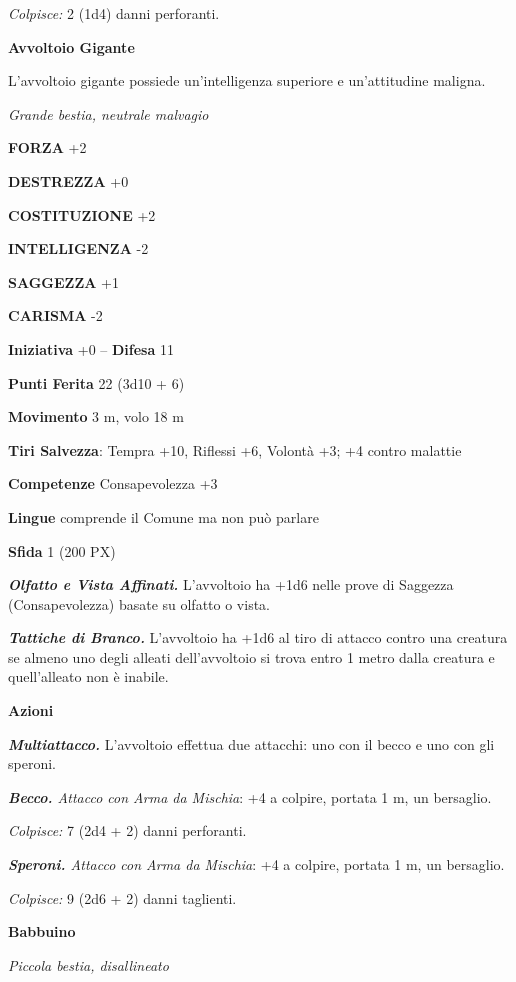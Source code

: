 \begin{multicols}{2}
\textit{Colpisce:} 2 (1d4) danni perforanti.

\medskip\textbf{Avvoltoio Gigante}

L'avvoltoio gigante possiede un'intelligenza superiore e un'attitudine maligna.

\textit{Grande bestia, neutrale malvagio}

\textbf{FORZA} +2

\textbf{DESTREZZA} +0

\textbf{COSTITUZIONE} +2

\textbf{INTELLIGENZA} -2

\textbf{SAGGEZZA} +1

\textbf{CARISMA} -2

\textbf{Iniziativa} +0 -- \textbf{Difesa} 11

\textbf{Punti Ferita} 22 (3d10 + 6)

\textbf{Movimento} 3 m, volo 18 m

\textbf{Tiri Salvezza}: Tempra +10, Riflessi +6, Volontà +3; +4 contro malattie

\textbf{Competenze} Consapevolezza +3

\textbf{Lingue} comprende il Comune ma non può parlare

\textbf{Sfida} 1 (200 PX)

\textit{\textbf{Olfatto e Vista Affinati.}} L'avvoltoio ha +1d6 nelle prove di Saggezza (Consapevolezza) basate su olfatto o vista.

\textit{\textbf{Tattiche di Branco.}} L'avvoltoio ha +1d6 al tiro di attacco contro una creatura se almeno uno degli alleati dell'avvoltoio si trova entro 1 metro dalla creatura e quell'alleato non è inabile.

\textbf{Azioni}

\textit{\textbf{Multiattacco.}} L'avvoltoio effettua due attacchi: uno con il becco e uno con gli speroni.

\textit{\textbf{Becco.} Attacco con Arma da Mischia}: +4 a colpire, portata 1 m, un bersaglio.

\textit{Colpisce:} 7 (2d4 + 2) danni perforanti.

\textit{\textbf{Speroni.} Attacco con Arma da Mischia}: +4 a colpire, portata 1 m, un bersaglio.

\textit{Colpisce:} 9 (2d6 + 2) danni taglienti.

\medskip\textbf{Babbuino}

\textit{Piccola bestia, disallineato}


\end{multicols}
